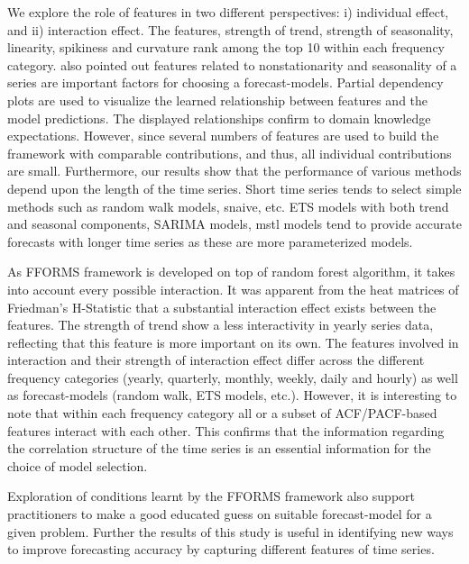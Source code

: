 \documentclass[11pt,a4paper,]{article}
\begin{document}
We explore the role of features in two different perspectives: i)
individual effect, and ii) interaction effect. The features, strength of
trend, strength of seasonality, linearity, spikiness and curvature rank
among the top 10 within each frequency category.
\textcite{lemke2010meta} also pointed out features related to
nonstationarity and seasonality of a series are important factors for
choosing a forecast-models. Partial dependency plots are used to
visualize the learned relationship between features and the model
predictions. The displayed relationships confirm to domain knowledge
expectations. However, since several numbers of features are used to
build the framework with comparable contributions, and thus, all
individual contributions are small. Furthermore, our results show that
the performance of various methods depend upon the length of the time
series. Short time series tends to select simple methods such as random
walk models, snaive, etc. ETS models with both trend and seasonal
components, SARIMA models, mstl models tend to provide accurate
forecasts with longer time series as these are more parameterized
models.

As FFORMS framework is developed on top of random forest algorithm, it
takes into account every possible interaction. It was apparent from the
heat matrices of Friedman's H-Statistic that a substantial interaction
effect exists between the features. The strength of trend show a less
interactivity in yearly series data, reflecting that this feature is
more important on its own. The features involved in interaction and
their strength of interaction effect differ across the different
frequency categories (yearly, quarterly, monthly, weekly, daily and
hourly) as well as forecast-models (random walk, ETS models, etc.).
However, it is interesting to note that within each frequency category
all or a subset of ACF/PACF-based features interact with each other.
This confirms that the information regarding the correlation structure
of the time series is an essential information for the choice of model
selection.

Exploration of conditions learnt by the FFORMS framework also support
practitioners to make a good educated guess on suitable forecast-model
for a given problem. Further the results of this study is useful in
identifying new ways to improve forecasting accuracy by capturing
different features of time series.

\printbibliography[title=References]
\end{document}
